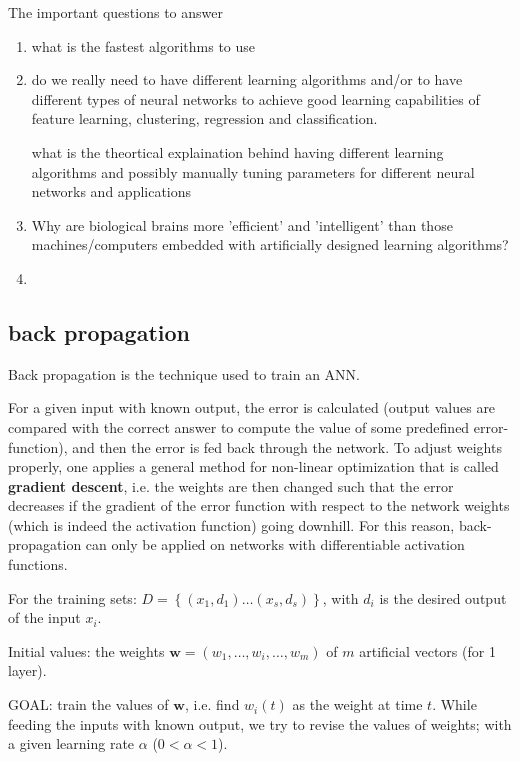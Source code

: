 The important questions to answer
\begin{enumerate}
  \item what is the fastest algorithms to use
  
  \item do we really need to have different learning algorithms and/or to have
  different types of neural networks to achieve
   good learning capabilities of feature learning, clustering, regression and
   classification.
  
  what is the theortical explaination behind having different learning
  algorithms   and possibly manually  tuning  parameters for different  neural
  networks  and  applications
  
  \item Why   are   biological   brains   more   'efficient'   and 'intelligent'
  than  those  machines/computers  embedded with artificially designed
  learning algorithms? 
  
  \item 

\end{enumerate}

\subsection{back propagation}
\label{sec:back-propagation}

Back propagation is the technique used to train an ANN.

For a given input with known output, the error is calculated (output values are
compared with the correct answer to compute the value of some predefined
error-function), and then the error is fed back through the network.
To adjust weights properly, one applies a general method for non-linear
optimization that is called {\bf gradient descent}, i.e.
the weights are then changed such that the error decreases if the gradient of
the error function with respect to the network weights (which is indeed the
activation function) going downhill. For this reason, back-propagation can only
be applied on networks with differentiable activation functions.

For the training sets: $D = \left\{  (x_1,d_1) \ldots (x_s, d_s) \right\}$, with
$d_i$ is the desired output of the input $x_i$.

Initial values: the weights $\mathbf{w} = (w_1, \ldots, w_i, \ldots, w_m)$ of
$m$ artificial vectors (for 1 layer).

GOAL: train the values of $\mathbf{w}$, i.e. find $w_i(t)$ as the weight at time
$t$. While feeding the inputs with known output, we try to revise the values of
weights; with a given learning rate $\alpha$ ($0 < \alpha < 1$). 

